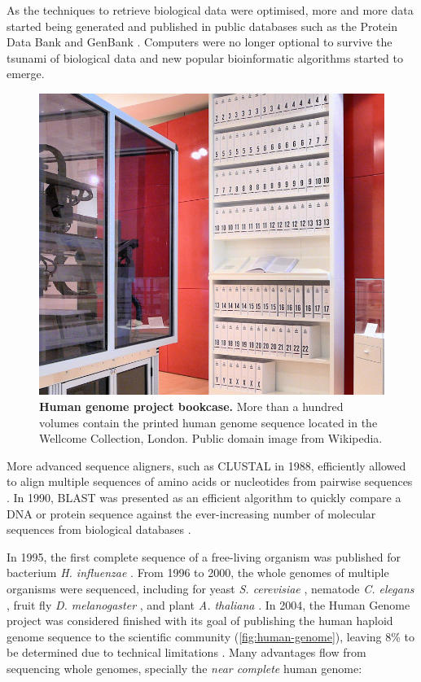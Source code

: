 As the techniques to retrieve biological data were optimised, more and more data started being generated and published in public databases such as the Protein Data Bank \cite{protein-data-bank:1971tm} and GenBank \cite{burks:1985ts}. Computers were no longer optional to survive the tsunami of biological data and new popular bioinformatic algorithms started to emerge.
\begin{figure}
  \includegraphics[width=\linewidth]{images/intro/human-genome-project-bookcase}
  \caption[Human genome project bookcase]{\textbf{Human genome project bookcase.} More than a hundred volumes contain the printed human genome sequence located in the Wellcome Collection, London. Public domain image from Wikipedia.}
  \label{fig:human-genome}
\end{figure}
More advanced sequence aligners, such as CLUSTAL in 1988, efficiently allowed to align multiple sequences of amino acids or nucleotides from pairwise sequences \cite{higgins:1988ul}. In 1990, BLAST was presented as an efficient algorithm to quickly compare a DNA or protein sequence against the ever-increasing number of molecular sequences from biological databases \cite{altschul:1990vt}.

In 1995, the first complete sequence of a free-living organism was published for bacterium \emph{H. influenzae} \cite{fleischmann:1995vz}. From 1996 to 2000, the whole genomes of multiple organisms were sequenced, including for yeast \emph{S. cerevisiae} \cite{goffeau:1996tk}, nematode \emph{C. elegans} \cite{the-c.-elegans-sequencing-consortium:1998wf}, fruit fly \emph{D. melanogaster} \cite{myers:2000wk,adams:2000tj}, and plant \emph{A. thaliana} \cite{the-arabidopsis-genome-initiative:2000tm}. In 2004, the Human Genome project was considered finished with its goal of publishing the human haploid genome sequence to the scientific community (\autoref{fig:human-genome}), leaving 8\% to be determined due to technical limitations \cite{consortium:2004wi,nurk:2021up}. Many advantages flow from sequencing whole genomes, specially the \emph{near complete} human genome:

